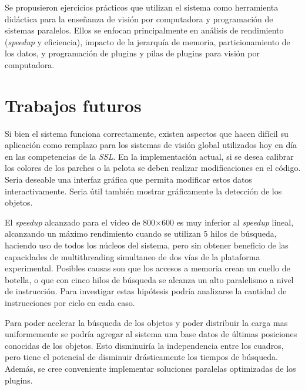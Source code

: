 Se propusieron ejercicios prácticos que utilizan el sistema como herramienta
didáctica para la enseñanza de visión por computadora y programación de sistemas
paralelos. Ellos se enfocan principalmente en análisis de rendimiento
(\emph{speedup} y eficiencia), impacto de la jerarquía de memoria,
particionamiento de los datos, y programación de plugins y pilas de plugins para
visión por computadora.

\section{Trabajos futuros}

\label{trabajosFuturos}

Si bien el sistema funciona correctamente, existen aspectos que hacen difícil su
aplicación como remplazo para los sistemas de visión global utilizados hoy en
día en las competencias de la \emph{SSL}. En la implementación actual, si se
desea calibrar los colores de los parches o la pelota se deben realizar
modificaciones en el código. Seria deseable una interfaz gráfica que permita
modificar estos datos interactivamente. Seria útil también mostrar gráficamente
la detección de los objetos.

El \emph{speedup} alcanzado para el video de 800$\times$600 es muy inferior al
\emph{speedup} lineal, alcanzando un máximo rendimiento cuando se utilizan 5
hilos de búsqueda, haciendo uso de todos los núcleos del sistema, pero sin
obtener beneficio de las capacidades de multithreading simultaneo de dos vías de
la plataforma experimental. Posibles causas son que los accesos a memoria crean
un cuello de botella, o que con cinco hilos de búsqueda se alcanza un alto
paralelismo a nivel de instrucción. Para investigar estas hipótesis podría
analizarse la cantidad de instrucciones por ciclo en cada caso.

Para poder acelerar la búsqueda de los objetos y poder distribuir la carga mas
uniformemente se podría agregar al sistema una base datos de últimas posiciones
conocidas de los objetos. Esto disminuiría la independencia entre los cuadros,
pero tiene el potencial de disminuir drásticamente los tiempos de búsqueda.
Además, se cree conveniente implementar soluciones paralelas optimizadas de los
plugins.


